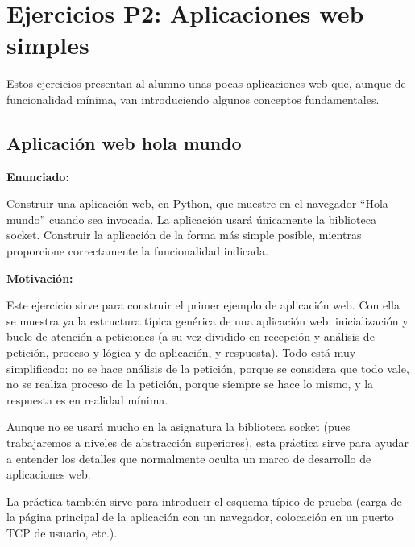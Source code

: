 \newpage

\section{Ejercicios P2: Aplicaciones web simples}

Estos ejercicios presentan al alumno unas pocas aplicaciones web que, aunque de funcionalidad mínima, van introduciendo algunos conceptos fundamentales.

\subsection{Aplicación web hola mundo}
\label{subsec:aplweb-hola-mundo}

\textbf{Enunciado:}

Construir una aplicación web, en Python, que muestre en el navegador ``Hola mundo'' cuando sea invocada. La aplicación usará únicamente la biblioteca socket. Construir la aplicación de la forma más simple posible, mientras proporcione correctamente la funcionalidad indicada.

\textbf{Motivación:}

Este ejercicio sirve para construir el primer ejemplo de aplicación web. Con ella se muestra ya la estructura típica genérica de una aplicación web: inicialización y bucle de atención a peticiones (a su vez dividido en recepción y análisis de petición, proceso y lógica y de aplicación, y respuesta). Todo está muy simplificado: no se hace análisis de la petición, porque se considera que todo vale, no se realiza proceso de la petición, porque siempre se hace lo mismo, y la respuesta es en realidad mínima.

Aunque no se usará mucho en la asignatura la biblioteca socket (pues trabajaremos a niveles de abstracción superiores), esta práctica sirve para ayudar a entender los detalles que normalmente oculta un marco de desarrollo de aplicaciones web.

La práctica también sirve para introducir el esquema típico de prueba (carga de la página principal de la aplicación con un navegador, colocación en un puerto TCP de usuario, etc.).

